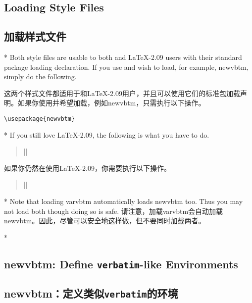 \begin{paracol}{2}
\subsection{Loading Style Files}
\label{sec:usage-load}
\switchcolumn
\subsection{加载样式文件}

\switchcolumn[0]*
Both style files are usable to both \LaTeXe{} and \LaTeX-2.09
users with their standard package loading declaration.  If you use
\LaTeXe{} and wish to load, for example, \textsf{newvbtm}, simply do the
following.

\SpecialUsageIndex{\usepackage}
\begin{iverbatim}
\usepackage{newvbtm}
\end{iverbatim}
\switchcolumn
这两个样式文件都适用于\LaTeXe{}和\LaTeX-2.09用户，并且可以使用它们的标准包加载声明。如果你使用\LaTeXe{}并希望加载，例如\textsf{newvbtm}，只需执行以下操作。
\begin{verbatim}
\usepackage{newvbtm}
\end{verbatim}

\switchcolumn[0]*
If you still love \LaTeX-2.09, the following is what you have to do.
\begin{quote}
\SpecialUsageIndex{\documentstyle}
|\documentstyle[..,newvbtm,...]|
\end{quote}
\switchcolumn
如果你仍然在使用\LaTeX-2.09，你需要执行以下操作。
\begin{quote}
|\documentstyle[..,newvbtm,...]|
\end{quote}

\switchcolumn[0]*
Note that loading \textsf{varvbtm} automatically loads \textsf{newvbtm}
too.  Thus you may not load both though doing so is safe.
\switchcolumn
请注意，加载\textsf{varvbtm}会自动加载\textsf{newvbtm}。因此，尽管可以安全地这样做，但不要同时加载两者。

\switchcolumn[0]*
\subsection{\textsf{newvbtm}: Define \texttt{verbatim}-like Environments}
\label{sec:usage-new}
\switchcolumn
\subsection{\textsf{newvbtm}：定义类似\texttt{verbatim}的环境}


\end{paracol}
